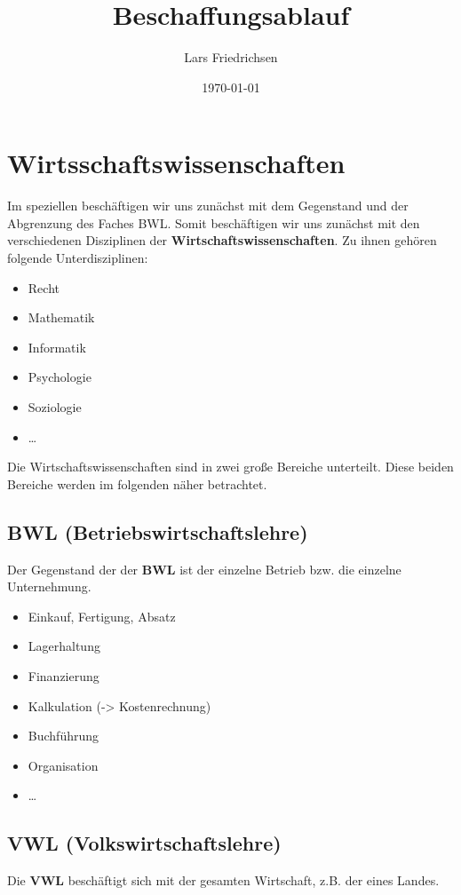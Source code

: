 \documentclass[a4paper,11pt]{scrartcl}	%
\title{Beschaffungsablauf}
\author{Lars Friedrichsen}
\date{\today}
\begin{document}
\section{Wirtsschaftswissenschaften}

Im speziellen beschäftigen wir uns zunächst mit dem Gegenstand und der Abgrenzung des Faches BWL.
Somit beschäftigen wir uns zunächst mit den verschiedenen Disziplinen der \textbf{Wirtschaftswissenschaften}.
Zu ihnen gehören folgende Unterdisziplinen:

	\begin{itemize}
		\item Recht
		\item Mathematik
		\item Informatik
		\item Psychologie
		\item Soziologie
		\item \dots
	\end{itemize}


Die Wirtschaftswissenschaften sind in zwei große Bereiche unterteilt. Diese beiden Bereiche werden im folgenden näher betrachtet.

	\subsection{BWL (Betriebswirtschaftslehre)}
	
	Der Gegenstand der der \textbf{BWL} ist der einzelne Betrieb bzw. die einzelne Unternehmung.
	
		\begin{itemize}
			\item Einkauf, Fertigung, Absatz
			\item Lagerhaltung
			\item Finanzierung
			\item Kalkulation (-> Kostenrechnung)
			\item Buchführung
			\item Organisation
			\item \dots
		\end{itemize}





	\subsection{VWL (Volkswirtschaftslehre)}
	
	Die \textbf{VWL} beschäftigt sich mit der gesamten Wirtschaft, z.B. der eines Landes.
	
\end{document}
